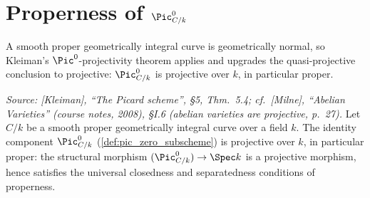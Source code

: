 \section{Properness of \(\Pic^0_{C/k}\)}
\label{sec:pic0_proper}

A smooth proper geometrically integral curve is geometrically normal,
so Kleiman's \(\Pic^0\)-projectivity theorem applies and upgrades the
quasi-projective conclusion to projective: \(\Pic^0_{C/k}\) is
projective over \(k\), in particular proper.

\begin{theorem}
  \label{thm:pic0_proper}

  \textit{Source: [Kleiman], ``The Picard scheme'', \S 5,
  Thm.~5.4; cf.\ [Milne], ``Abelian Varieties'' (course notes,
  2008), \S I.6 (abelian varieties are projective, p.~27).}
  Let \(C/k\) be a smooth proper geometrically integral curve over a
  field \(k\). The identity component \(\Pic^0_{C/k}\)
  (\cref{def:pic_zero_subscheme}) is projective over \(k\), in
  particular proper: the structural morphism
  \((\Pic^0_{C/k}) \to \Spec k\) is a projective morphism, hence
  satisfies the universal closedness and separatedness conditions of
  properness.
\end{theorem}

